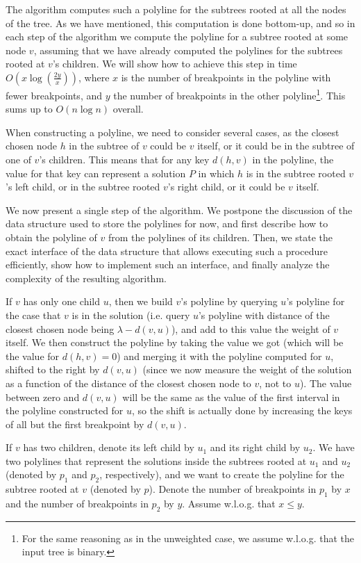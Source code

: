 \documentclass[a4paper,UKenglish]{lipics-v2016}
\theoremstyle{plain}
\begin{document}
The algorithm computes such a polyline for the subtrees rooted at all the nodes of the tree. As we have mentioned, this computation is done bottom-up, and so in each step of the algorithm we compute the polyline for a subtree rooted at some node $v$, assuming that we have already computed the polylines for the subtrees rooted at $v$'s children. We will show how to achieve this step in time $O(x \log (\frac{2y}{x}))$, where $x$ is the number of breakpoints in the polyline with fewer breakpoints, and $y$ the number of breakpoints in the other polyline\footnote{For the same reasoning as in the unweighted case, we assume w.l.o.g. that the input tree is binary.}. This sums up to $O(n \log n)$ overall.


When constructing a polyline, we need to consider several cases, as the closest chosen node $h$ in the subtree of $v$ could be $v$ itself, or it could be in the subtree of one of $v$'s children. This means that for any key $d(h,v)$ in the polyline, the value for that key can represent a solution $P$ in which $h$ is in the subtree rooted $v$'s left child, or in the subtree rooted $v$'s right child, or it could be $v$ itself.


\medskip {} We now present a single step of the algorithm. We postpone the discussion of the data structure used to store the polylines for now, and first describe how to obtain the polyline of $v$ from the polylines of its children. Then, we state the exact interface of the data structure that allows executing such a procedure efficiently, show how to implement such an interface, and finally analyze the complexity of the resulting algorithm.

If $v$ has only one child $u$, then we build $v$'s polyline by querying $u$'s polyline for the case that $v$ is in the solution (i.e. query $u$'s polyline with distance of the closest chosen node being $\lambda-d(v,u)$), and add to this value the weight of $v$ itself. We then construct the polyline by taking the value we got (which will be the value for $d(h,v)=0$) and merging it with the polyline computed for $u$, shifted to the right by $d(v,u)$ (since we now measure the weight of the solution as a function of the distance of the closest chosen node to $v$, not to $u$). The value between zero and $d(v,u)$ will be the same as the value of the first interval in the polyline constructed for $u$, so the shift is actually done by increasing the keys of all but the first breakpoint by $d(v,u)$.

If $v$ has two children, denote its left child by $u_1$ and its right child by $u_2$. We have two polylines that represent the solutions inside the subtrees rooted at $u_1$ and $u_2$ (denoted by $p_1$ and $p_2$, respectively), and we want to create the polyline for the subtree rooted at $v$ (denoted by $p$). Denote the number of breakpoints in $p_1$ by $x$ and the number of breakpoints in $p_2$ by $y$. Assume w.l.o.g. that $x \leq y$.
\end{document}
